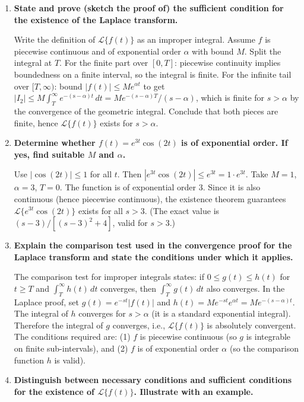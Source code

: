 \documentclass[12pt,a4paper]{article}
\begin{document}
\begin{enumerate}[label=\textbf{D\arabic*.}]

\item \textbf{State and prove (sketch the proof of) the sufficient condition for the existence of the Laplace transform.}

Write the definition of $\mathcal{L}\{f(t)\}$ as an improper integral. Assume $f$ is piecewise continuous and of exponential order $\alpha$ with bound $M$. Split the integral at $T$. For the finite part over $[0,T]$: piecewise continuity implies boundedness on a finite interval, so the integral is finite. For the infinite tail over $[T,\infty)$: bound $|f(t)| \leq M e^{\alpha t}$ to get $|I_2| \leq M \int_T^\infty e^{-(\text{s}-\alpha)t}\, dt = M e^{-(s-\alpha)T}/(s-\alpha)$, which is finite for $s > \alpha$ by the convergence of the geometric integral. Conclude that both pieces are finite, hence $\mathcal{L}\{f(t)\}$ exists for $s > \alpha$.

\item \textbf{Determine whether $f(t) = e^{3t}\cos(2t)$ is of exponential order. If yes, find suitable $M$ and $\alpha$.}

Use $|\cos(2t)| \leq 1$ for all $t$. Then $|e^{3t}\cos(2t)| \leq e^{3t} = 1 \cdot e^{3t}$. Take $M = 1$, $\alpha = 3$, $T = 0$. The function is of exponential order 3. Since it is also continuous (hence piecewise continuous), the existence theorem guarantees $\mathcal{L}\{e^{3t}\cos(2t)\}$ exists for all $s > 3$. (The exact value is $(s-3)/[(s-3)^2+4]$, valid for $s>3$.)

\item \textbf{Explain the comparison test used in the convergence proof for the Laplace transform and state the conditions under which it applies.}

The comparison test for improper integrals states: if $0 \leq g(t) \leq h(t)$ for $t \geq T$ and $\int_T^\infty h(t)\, dt$ converges, then $\int_T^\infty g(t)\, dt$ also converges. In the Laplace proof, set $g(t) = e^{-st}|f(t)|$ and $h(t) = M e^{-st}e^{\alpha t} = Me^{-(s-\alpha)t}$. The integral of $h$ converges for $s > \alpha$ (it is a standard exponential integral). Therefore the integral of $g$ converges, i.e., $\mathcal{L}\{f(t)\}$ is absolutely convergent. The conditions required are: (1) $f$ is piecewise continuous (so $g$ is integrable on finite sub-intervals), and (2) $f$ is of exponential order $\alpha$ (so the comparison function $h$ is valid).

\item \textbf{Distinguish between necessary conditions and sufficient conditions for the existence of $\mathcal{L}\{f(t)\}$. Illustrate with an example.}


\end{enumerate}
\end{document}
